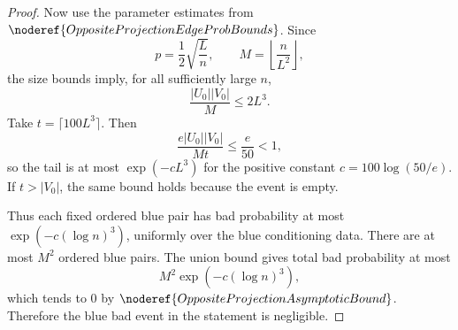 \begin{proof}
Now use the parameter estimates from
\(\noderef{OppositeProjectionEdgeProbBounds}\).  Since
\[
p=\frac12\sqrt{\frac{L}{n}},\qquad
M=\left\lfloor\frac{n}{L^2}\right\rfloor ,
\]
the size bounds imply, for all sufficiently large \(n\),
\[
\frac{|U_0||V_0|}{M}\le 2L^3 .
\]
Take \(t=\lceil100L^3\rceil\).  Then
\[
\frac{e|U_0||V_0|}{Mt}\le \frac e{50}<1,
\]
so the tail is at most \(\exp(-cL^3)\) for the positive constant
\(c=100\log(50/e)\).  If \(t>|V_0|\), the same bound holds because the event
is empty.

Thus each fixed ordered blue pair has bad probability at most
\(\exp(-c(\log n)^3)\), uniformly over the blue conditioning data.  There
are at most \(M^2\) ordered blue pairs.  The union bound gives total bad
probability at most
\[
M^2\exp(-c(\log n)^3),
\]
which tends to \(0\) by \(\noderef{OppositeProjectionAsymptoticBound}\).
Therefore the blue bad event in the statement is negligible.
\end{proof}
